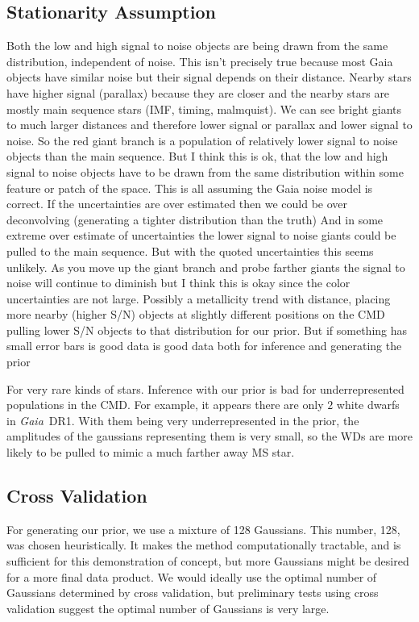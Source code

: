 \documentclass[modern]{aastex61}
\newcommand{\acronym}[1]{{\small{#1}}}
\newcommand{\project}[1]{\textsl{#1}}
\newcommand{\gaia}{\project{Gaia}}
\newcommand{\cmd}{\acronym{CMD}}
\begin{document}
\subsection{Stationarity Assumption}
Both the low and high signal to noise objects are being drawn from the same distribution, independent of noise. This isn't precisely true because most Gaia objects have similar noise but their signal depends on their distance. Nearby stars have higher signal (parallax) because they are closer and the nearby stars are mostly main sequence stars (IMF, timing, malmquist). We can see bright giants to much larger distances and therefore lower signal or parallax and lower signal to noise. So the red giant branch is a population of relatively lower signal to noise objects than the main sequence. But I think this is ok, that the low and high signal to noise objects have to be drawn from the same distribution within some feature or patch of the space. This is all assuming the Gaia noise model is correct. If the uncertainties are over estimated then we could be over deconvolving (generating a tighter distribution than the truth) And in some extreme over estimate of uncertainties the lower signal to noise giants could be pulled to the main sequence. But with the quoted uncertainties this seems unlikely. As you move up the giant branch and probe farther giants the signal to noise will continue to diminish but I think this is okay since the color uncertainties are not large. Possibly a metallicity trend with distance, placing more nearby (higher S/N) objects at slightly different positions on the CMD pulling lower S/N objects to that distribution for our prior. But if something has small error bars is good data is good data both for inference and generating the prior

For very rare kinds of stars. Inference with our prior is bad for underrepresented populations in the \cmd. For example, it appears there are only $2$ white dwarfs in \gaia\ DR1. With them being very underrepresented in the prior, the amplitudes of the gaussians representing them is very small, so the WDs are more likely to be pulled to mimic a much farther away MS star.

\subsection{Cross Validation}
For generating our prior, we use a mixture of 128 Gaussians. This number, 128, was chosen heuristically. It makes the method computationally tractable, and is sufficient for this demonstration of concept, but more Gaussians might be desired for a more final data product. We would ideally use the optimal number of Gaussians determined by cross validation, but preliminary tests using cross validation suggest the optimal number of Gaussians is very large.
\end{document}
